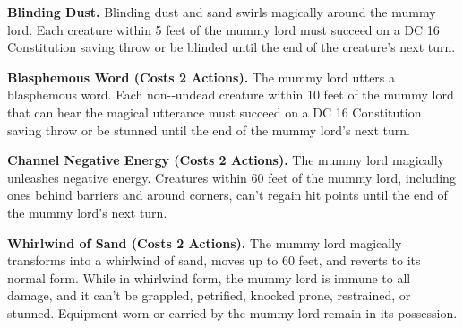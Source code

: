 \documentclass[
]{article}
\begin{document}
\textbf{Blinding Dust.} Blinding dust and sand swirls magically around
the mummy lord. Each creature within 5 feet of the mummy lord must
succeed on a DC 16 Constitution saving throw or be blinded until the end
of the creature's next turn.

\textbf{Blasphemous Word (Costs 2 Actions).} The mummy lord utters a
blasphemous word. Each non-­‐undead creature within 10 feet of the mummy
lord that can hear the magical utterance must succeed on a DC 16
Constitution saving throw or be stunned until the end of the mummy
lord's next turn.

\textbf{Channel Negative Energy (Costs 2 Actions).} The mummy lord
magically unleashes negative energy. Creatures within 60 feet of the
mummy lord, including ones behind barriers and around corners, can't
regain hit points until the end of the mummy lord's next turn.

\textbf{Whirlwind of Sand (Costs 2 Actions).} The mummy lord magically
transforms into a whirlwind of sand, moves up to 60 feet, and reverts to
its normal form. While in whirlwind form, the mummy lord is immune to
all damage, and it can't be grappled, petrified, knocked prone,
restrained, or stunned. Equipment worn or carried by the mummy lord
remain in its possession.
\end{document}

